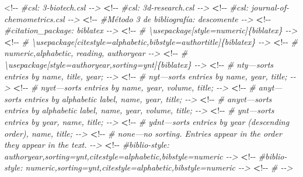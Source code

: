 \documentclass[11pt,a4paper,oneside,]{article}
\newenvironment{Shaded}{\begin{snugshade}}{\end{snugshade}}
\newcommand{\CommentTok}[1]{\textcolor[rgb]{0.56,0.35,0.01}{\textit{#1}}}
\newcommand{\ErrorTok}[1]{\textcolor[rgb]{0.64,0.00,0.00}{\textbf{#1}}}
\newcommand{\SpecialCharTok}[1]{\textcolor[rgb]{0.00,0.00,0.00}{#1}}
\numberwithin{dummy}{section}
\theoremstyle{ocrenumbox}
\theoremstyle{blacknumex}
\theoremstyle{blacknumbox}
\theoremstyle{ocrenum}
\theoremstyle{ocrenum}
\begin{document}
\begin{Shaded}
\begin{Highlighting}[numbers=left,,firstnumber=1101,]
\SpecialCharTok{\textless{}!{-}{-}} \CommentTok{\#csl: 3{-}biotech.csl {-}{-}\textgreater{}}
\ErrorTok{\textless{}}\SpecialCharTok{!{-}{-}} \CommentTok{\#csl: 3d{-}research.csl {-}{-}\textgreater{}}
\ErrorTok{\textless{}}\SpecialCharTok{!{-}{-}} \CommentTok{\#csl: journal{-}of{-}chemometrics.csl {-}{-}\textgreater{}}
\ErrorTok{\textless{}}\SpecialCharTok{!{-}{-}} \CommentTok{\#Método 3 de bibliografía: descomente {-}{-}\textgreater{}}
\ErrorTok{\textless{}}\SpecialCharTok{!{-}{-}} \CommentTok{\#citation\_package: biblatex {-}{-}\textgreater{}}
\ErrorTok{\textless{}}\SpecialCharTok{!{-}{-}} \CommentTok{\# \textbackslash{}usepackage[style=numeric]\{biblatex\} {-}{-}\textgreater{}}
\ErrorTok{\textless{}}\SpecialCharTok{!{-}{-}} \CommentTok{\# \textbackslash{}usepackage[citestyle=alphabetic,bibstyle=authortitle]\{biblatex\} {-}{-}\textgreater{}}
\ErrorTok{\textless{}}\SpecialCharTok{!{-}{-}} \CommentTok{\# numeric,alphabetic, reading, authoryear {-}{-}\textgreater{}}
\ErrorTok{\textless{}}\SpecialCharTok{!{-}{-}} \CommentTok{\# \textbackslash{}usepackage[style=authoryear,sorting=ynt]\{biblatex\} {-}{-}\textgreater{}}
\ErrorTok{\textless{}}\SpecialCharTok{!{-}{-}} \CommentTok{\# nty—sorts entries by name, title, year; {-}{-}\textgreater{}}
\ErrorTok{\textless{}}\SpecialCharTok{!{-}{-}} \CommentTok{\# nyt—sorts entries by name, year, title; {-}{-}\textgreater{}}
\ErrorTok{\textless{}}\SpecialCharTok{!{-}{-}} \CommentTok{\# nyvt—sorts entries by name, year, volume, title; {-}{-}\textgreater{}}
\ErrorTok{\textless{}}\SpecialCharTok{!{-}{-}} \CommentTok{\# anyt—sorts entries by alphabetic label, name, year, title; {-}{-}\textgreater{}}
\ErrorTok{\textless{}}\SpecialCharTok{!{-}{-}} \CommentTok{\# anyvt—sorts entries by alphabetic label, name, year, volume, title; {-}{-}\textgreater{}}
\ErrorTok{\textless{}}\SpecialCharTok{!{-}{-}} \CommentTok{\# ynt—sorts entries by year, name, title; {-}{-}\textgreater{}}
\ErrorTok{\textless{}}\SpecialCharTok{!{-}{-}} \CommentTok{\# ydnt—sorts entries by year (descending order), name, title; {-}{-}\textgreater{}}
\ErrorTok{\textless{}}\SpecialCharTok{!{-}{-}} \CommentTok{\# none—no sorting. Entries appear in the order they appear in the text. {-}{-}\textgreater{}}
\ErrorTok{\textless{}}\SpecialCharTok{!{-}{-}} \CommentTok{\#biblio{-}style: authoryear,sorting=ynt,citestyle=alphabetic,bibstyle=numeric {-}{-}\textgreater{}}
\ErrorTok{\textless{}}\SpecialCharTok{!{-}{-}} \CommentTok{\#biblio{-}style: numeric,sorting=ynt,citestyle=alphabetic,bibstyle=numeric {-}{-}\textgreater{}}
\ErrorTok{\textless{}}\SpecialCharTok{!{-}{-}} \CommentTok{\# {-}{-}\textgreater{}}

\end{Highlighting}
\end{Shaded}
\end{document}
